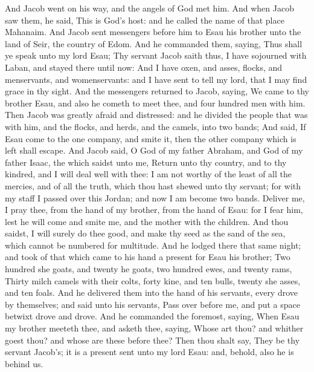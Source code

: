 \begin{biblechapter} %
 And Jacob went on his way, and the angels of God met him.
\verse And when Jacob saw them, he said, This is God's host: and he called the name of that place Mahanaim.
\verse And Jacob sent messengers before him to Esau his brother unto the land of Seir, the country of Edom.
\verse And he commanded them, saying, Thus shall ye speak unto my lord Esau; Thy servant Jacob saith thus, I have sojourned with Laban, and stayed there until now:
\verse And I have oxen, and asses, flocks, and menservants, and womenservants: and I have sent to tell my lord, that I may find grace in thy sight.
\verse And the messengers returned to Jacob, saying, We came to thy brother Esau, and also he cometh to meet thee, and four hundred men with him.
\verse Then Jacob was greatly afraid and distressed: and he divided the people that was with him, and the flocks, and herds, and the camels, into two bands;
\verse And said, If Esau come to the one company, and smite it, then the other company which is left shall escape.
\verse And Jacob said, O God of my father Abraham, and God of my father Isaac, the \LORD which saidst unto me, Return unto thy country, and to thy kindred, and I will deal well with thee:
\verse I am not worthy of the least of all the mercies, and of all the truth, which thou hast shewed unto thy servant; for with my staff I passed over this Jordan; and now I am become two bands.
\verse Deliver me, I pray thee, from the hand of my brother, from the hand of Esau: for I fear him, lest he will come and smite me, and the mother with the children.
\verse And thou saidst, I will surely do thee good, and make thy seed as the sand of the sea, which cannot be numbered for multitude.
\verse And he lodged there that same night; and took of that which came to his hand a present for Esau his brother;
\verse Two hundred she goats, and twenty he goats, two hundred ewes, and twenty rams,
\verse Thirty milch camels with their colts, forty kine, and ten bulls, twenty she asses, and ten foals.
\verse And he delivered them into the hand of his servants, every drove by themselves; and said unto his servants, Pass over before me, and put a space betwixt drove and drove.
\verse And he commanded the foremost, saying, When Esau my brother meeteth thee, and asketh thee, saying, Whose art thou? and whither goest thou? and whose are these before thee?
\verse Then thou shalt say, They be thy servant Jacob's; it is a present sent unto my lord Esau: and, behold, also he is behind us.

\end{biblechapter}

